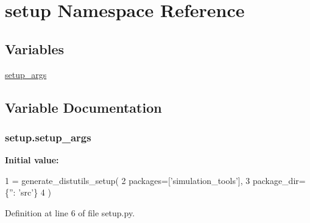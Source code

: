 \hypertarget{namespacesetup}{}\section{setup Namespace Reference}
\label{namespacesetup}
\subsection*{Variables}
\begin{DoxyCompactItemize}
\item 
\hyperlink{namespacesetup_a504ffa482edfe0eff08f64b2f5dff0e9}{setup\+\_\+args}
\end{DoxyCompactItemize}


\subsection{Variable Documentation}
\subsubsection[{\texorpdfstring{setup\+\_\+args}{setup_args}}]{\setlength{\rightskip}{0pt plus 5cm}setup.\+setup\+\_\+args}\hypertarget{namespacesetup_a504ffa482edfe0eff08f64b2f5dff0e9}{}\label{namespacesetup_a504ffa482edfe0eff08f64b2f5dff0e9}
{\bfseries Initial value\+:}
\begin{DoxyCode}
1 = generate\_distutils\_setup(
2     packages=[\textcolor{stringliteral}{'simulation\_tools'}],
3     package\_dir=\{\textcolor{stringliteral}{''}: \textcolor{stringliteral}{'src'}\}
4 )
\end{DoxyCode}


Definition at line 6 of file setup.\+py.

